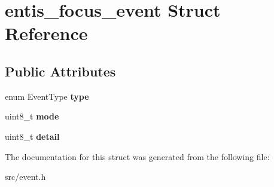 \hypertarget{structentis__focus__event}{}\section{entis\+\_\+focus\+\_\+event Struct Reference}
\label{structentis__focus__event}
\subsection*{Public Attributes}
\begin{DoxyCompactItemize}
\item 
\mbox{\label{structentis__focus__event_aaf59df33e0bde67705f6429b8d3012d1}} 
enum Event\+Type {\bfseries type}
\item 
\mbox{\label{structentis__focus__event_ab194cc98d6854dee36222c0dad2daf32}} 
uint8\+\_\+t {\bfseries mode}
\item 
\mbox{\label{structentis__focus__event_a944dc3ff091abaeaafe131c1cd8221ef}} 
uint8\+\_\+t {\bfseries detail}
\end{DoxyCompactItemize}


The documentation for this struct was generated from the following file\+:\begin{DoxyCompactItemize}
\item 
src/event.\+h\end{DoxyCompactItemize}
